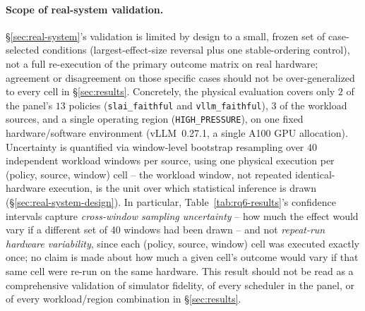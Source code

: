 \paragraph{Scope of real-system validation.} \S\ref{sec:real-system}'s
validation is limited by design to a small, frozen set of case-selected
conditions (largest-effect-size reversal plus one stable-ordering control),
not a full re-execution of the primary outcome matrix on real hardware; agreement
or disagreement on those specific cases should not be over-generalized to
every cell in \S\ref{sec:results}. Concretely, the physical evaluation
covers only $2$ of the panel's $13$ policies (\texttt{slai\_faithful} and
\texttt{vllm\_faithful}), $3$ of the workload sources, and a single
operating region (\texttt{HIGH\_PRESSURE}), on one fixed
hardware/software environment (vLLM~0.27.1, a single A100 GPU
allocation). Uncertainty is quantified via window-level bootstrap
resampling over $40$ independent workload windows per source, using one
physical execution per (policy, source, window) cell -- the workload
window, not repeated identical-hardware execution, is the unit over which
statistical inference is drawn (\S\ref{sec:real-system-design}). In
particular, Table~\ref{tab:rq6-results}'s confidence intervals capture
\emph{cross-window sampling uncertainty} -- how much the effect would vary
if a different set of 40 windows had been drawn -- and not
\emph{repeat-run hardware variability}, since each (policy, source, window)
cell was executed exactly once; no claim is made about how much a given
cell's outcome would vary if that same cell were re-run on the same
hardware. This result should not be read as a comprehensive validation of
simulator fidelity, of every scheduler in the panel, or of every
workload/region combination in \S\ref{sec:results}.
